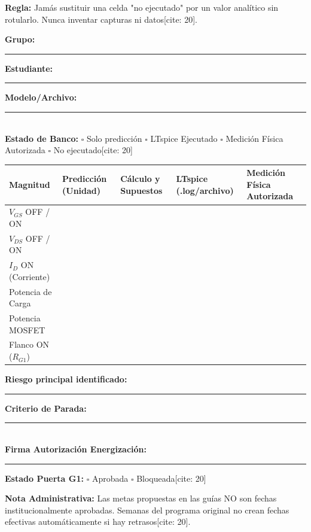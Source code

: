 \documentclass[10pt, a4paper, landscape]{article}
\begin{document}
\begin{tcolorbox}[colback=ucbblue!5, colframe=ucbblue, title=\textbf{Hito 3: Plantilla de Evidencia Trazable Estudiante/Docente[cite: 20]}]
    \textbf{Regla:} Jamás sustituir una celda "no ejecutado" por un valor analítico sin rotularlo. Nunca inventar capturas ni datos[cite: 20].
\end{tcolorbox}

\textbf{Grupo:} \rule{2cm}{0.15mm} \quad \textbf{Estudiante:} \rule{4cm}{0.15mm} \quad \textbf{Modelo/Archivo:} \rule{3cm}{0.15mm} \\[0.2cm]
\textbf{Estado de Banco:} $\square$ Solo predicción \quad $\square$ LTspice Ejecutado \quad $\square$ Medición Física Autorizada \quad $\square$ No ejecutado[cite: 20]

\par\vspace{0.2cm}\noindent
\renewcommand{\arraystretch}{1.8}
\begin{tabularx}{\textwidth}{|>{\raggedright\arraybackslash}p{2.5cm}|>{\raggedright\arraybackslash}X|>{\raggedright\arraybackslash}X|>{\raggedright\arraybackslash}X|>{\raggedright\arraybackslash}X|}
\hline
\rowcolor{gray!20}
\textbf{Magnitud} & \textbf{Predicción (Unidad)} & \textbf{Cálculo y Supuestos} & \textbf{LTspice (.log/archivo)} & \textbf{Medición Física Autorizada} \\ \hline
$V_{GS}$ OFF / ON & & & & \\ \hline
$V_{DS}$ OFF / ON & & & & \\ \hline
$I_D$ ON (Corriente) & & & & \\ \hline
Potencia de Carga & & & & \\ \hline
Potencia MOSFET & & & & \\ \hline
Flanco ON ($R_{G1}$) & & & & \\ \hline
\end{tabularx}

\vspace{0.3cm}
\textbf{Riesgo principal identificado:} \rule{5cm}{0.15mm} \quad \textbf{Criterio de Parada:} \rule{5cm}{0.15mm} \\[0.2cm]
\textbf{Firma Autorización Energización:} \rule{4cm}{0.15mm} \quad \textbf{Estado Puerta G1:} $\square$ Aprobada $\square$ Bloqueada[cite: 20]

\vspace{0.5cm}
\begin{tcolorbox}[colback=red!5, colframe=red!70!black, title=\textbf{Registro de Aprobaciones Administrativas y Calendario[cite: 20]}]
    \textbf{Nota Administrativa:} Las metas propuestas en las guías NO son fechas institucionalmente aprobadas. Semanas del programa original no crean fechas efectivas automáticamente si hay retrasos[cite: 20].
\end{tcolorbox}
\end{document}
